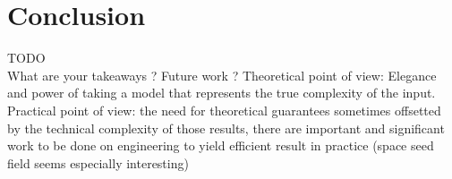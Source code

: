 \chapter*{Conclusion}
TODO\\
What are your takeaways ? Future work ?
Theoretical point of view: Elegance and power of taking a model that represents the true complexity of the input.
Practical point of view: the need for theoretical guarantees sometimes offsetted by the technical complexity of those results, there are important and significant work to be done on engineering to yield efficient result in practice (space seed field seems especially interesting) 

